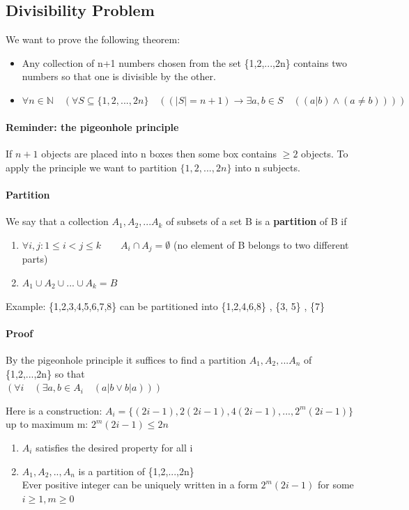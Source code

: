 \documentclass[9pt, letterpaper, oneside]{article}
\begin{document}

\subsection{Divisibility Problem}
We want to prove the following theorem:
\begin{itemize}
\item Any collection of n+1 numbers chosen from the set \{1,2,...,2n\} contains two numbers so that one is divisible by the other.
\item $\forall n \in \mathbb{N} \quad (\forall S \subseteq \{1,2,...,2n\} \quad ((|S| = n + 1) \to \exists a,b \in S \quad ((a | b) \wedge (a \neq b))))$
\end{itemize}

\paragraph{Reminder: the pigeonhole principle} 

If $n+1$ objects are placed into n boxes then some box contains $\geq 2$ objects. To apply the principle we want to partition $\{1,2,...,2n\}$ into n subjects. 

\paragraph{Partition} We say that a collection $A_1, A_2, ... A_k$ of subsets of a set B is a \textbf{partition} of B if
\begin{enumerate}
	\item $\forall i,j : 1 \leq i < j \leq k \qquad A_i \cap A_j = \emptyset$ (no element of B belongs to two different parts)
	\item $A_1 \cup A_2 \cup ... \cup A_k = B$
\end{enumerate}

Example: \{1,2,3,4,5,6,7,8\} can be partitioned into \{1,2,4,6,8\} , \{3, 5\} , \{7\}

\paragraph{Proof} By the pigeonhole principle it suffices to find a partition $A_1, A_2, ... A_n$ of \{1,2,...,2n\} so that\\
$(\forall i \quad (\exists a,b \in A_i \quad (a | b \vee b | a)))$

Here is a construction:
$A_i = \{(2i - 1), 2(2i -1), 4(2i -1), ..., 2^m(2i-1)\}$ up to maximum m: $2^m (2i-1) \leq 2n$
\begin{enumerate}
\item $A_i$ satisfies the desired property for all i
\item $A_1, A_2, .., A_n$ is a partition of \{1,2,...,2n\} \\
Ever positive integer can be uniquely written in a form $2^m(2i - 1)$ for some $i \geq 1, m \geq 0$
\end{enumerate}
\end{document}
